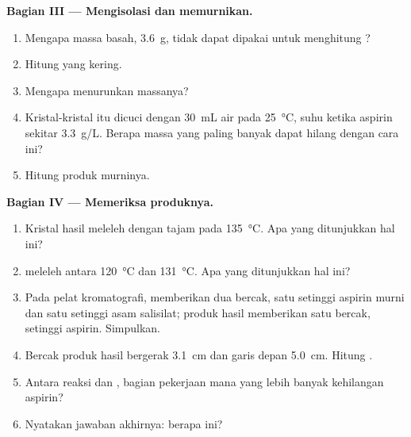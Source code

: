 \begin{problem}
\medskip
\noindent\textbf{Bagian III --- Mengisolasi dan memurnikan.}
\begin{enumerate}[resume]
  \item Mengapa massa basah, \qty{3.6}{g}, tidak dapat dipakai untuk
        menghitung ?
  \item Hitung   yang kering.
  \item Mengapa  menurunkan massanya?
  \item Kristal-kristal itu dicuci dengan \qty{30}{mL} air pada
        \qty{25}{\celsius}, suhu ketika aspirin  sekitar
        \qty{3.3}{g/L}. Berapa massa yang paling banyak dapat hilang
        dengan cara ini?
  \item Hitung  produk murninya.
\end{enumerate}

\medskip
\noindent\textbf{Bagian IV --- Memeriksa produknya.}
\begin{enumerate}[resume]
  \item Kristal hasil  meleleh dengan tajam pada
        \qty{135}{\celsius}. Apa yang ditunjukkan hal ini?
  \item {} meleleh antara \qty{120}{\celsius} dan
        \qty{131}{\celsius}. Apa yang ditunjukkan hal ini?
  \item Pada pelat kromatografi,  memberikan dua bercak,
        satu setinggi aspirin murni dan satu setinggi asam salisilat;
        produk hasil  memberikan satu bercak, setinggi
        aspirin. Simpulkan.
  \item Bercak produk hasil  bergerak \qty{3.1}{cm} dan
        garis depan  \qty{5.0}{cm}. Hitung .
  \item Antara reaksi dan , bagian pekerjaan mana yang
        lebih banyak kehilangan aspirin?
  \item Nyatakan jawaban akhirnya: berapa   ini?
\end{enumerate}
\end{problem}
